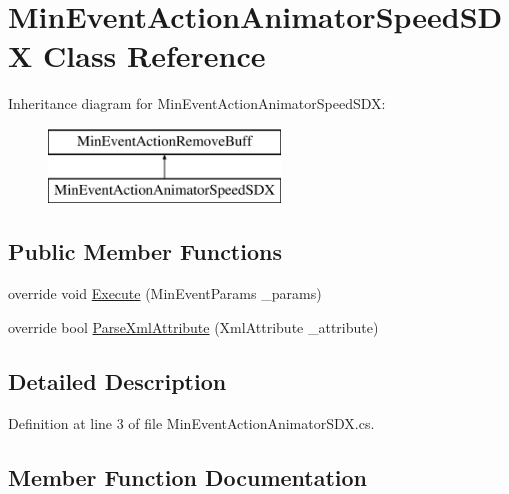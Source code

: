 \hypertarget{class_min_event_action_animator_speed_s_d_x}{}\section{Min\+Event\+Action\+Animator\+Speed\+S\+DX Class Reference}
\label{class_min_event_action_animator_speed_s_d_x}
Inheritance diagram for Min\+Event\+Action\+Animator\+Speed\+S\+DX\+:\begin{figure}[H]
\begin{center}
\leavevmode
\includegraphics[height=2.000000cm]{d8/ded/class_min_event_action_animator_speed_s_d_x}
\end{center}
\end{figure}
\subsection*{Public Member Functions}
\begin{DoxyCompactItemize}
\item 
override void \mbox{\hyperlink{class_min_event_action_animator_speed_s_d_x_af54acaa18227f6bf40208447b64922db}{Execute}} (Min\+Event\+Params \+\_\+params)
\item 
override bool \mbox{\hyperlink{class_min_event_action_animator_speed_s_d_x_aab4050a4d0a53fa0539594f9713ea74d}{Parse\+Xml\+Attribute}} (Xml\+Attribute \+\_\+attribute)
\end{DoxyCompactItemize}


\subsection{Detailed Description}


Definition at line 3 of file Min\+Event\+Action\+Animator\+S\+D\+X.\+cs.



\subsection{Member Function Documentation}
\mbox{\label{class_min_event_action_animator_speed_s_d_x_af54acaa18227f6bf40208447b64922db}} 
